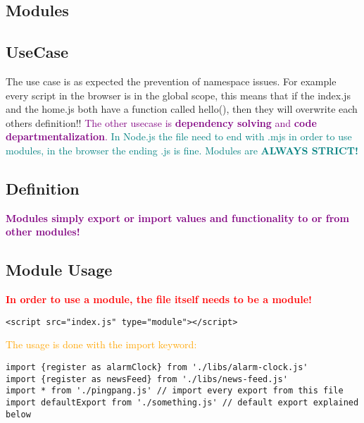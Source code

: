 \documentclass[main.tex,fontsize=6pt,paper=a4,paper=landscape,DIV=calc,]{scrartcl}
\begin{document}
\begin{multicols*}{4}
\section{Modules}

\subsection{UseCase}  
The use case is as expected the prevention of namespace issues.\newline
For example every script in the browser is in the global scope, this means that if the index.js and the home.js both have a function called hello(), then they will overwrite each others definition!!\newline
\textcolor{purple}{The other usecase is \textbf{dependency solving} and \textbf{code departmentalization}.}\newline
\textcolor{teal}{In Node.js the file need to end with .mjs in order to use modules, in the browser the ending .js is fine.}\newline
\textcolor{teal}{Modules are \textbf{ALWAYS STRICT!}}

\subsection{Definition}  
\textcolor{purple}{\textbf{Modules simply export or import values and functionality to or from other modules!}}

\subsection{Module Usage}  
\textcolor{red}{\textbf{In order to use a module, the file itself needs to be a module!}}\newline
\vspace{-2mm}
\begin{lstlisting}
<script src="index.js" type="module"></script>
\end{lstlisting}
\vspace{2mm}
\textcolor{orange}{The usage is done with the import keyword:}\newline
\vspace{-2mm}
\begin{lstlisting}
import {register as alarmClock} from './libs/alarm-clock.js'
import {register as newsFeed} from './libs/news-feed.js'
import * from './pingpang.js' // import every export from this file 
import defaultExport from './something.js' // default export explained below
\end{lstlisting}
\vspace{2mm}


\end{multicols*}
\end{document}
